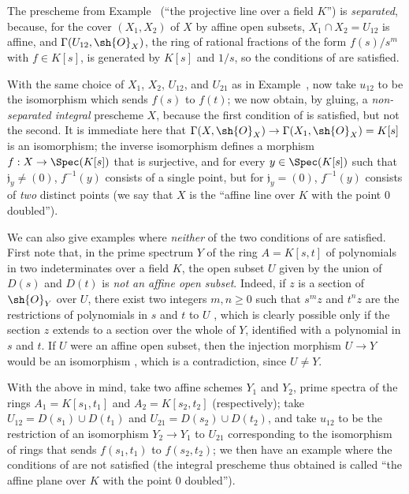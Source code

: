\begin{examples}[5.5.11]
\label{I.5.5.11}
The prescheme from Example~ (``the projective line over a field $K$'') is \emph{separated}, because, for the cover $(X_1,X_2)$ of $X$ by affine open subsets, $X_1\cap X_2=U_{12}$ is affine, and $\Gamma(U_{12},\sh{O}_X)$, the ring of rational fractions of the form $f(s)/s^m$ with $f\in K[s]$, is generated by $K[s]$ and $1/s$, so the conditions of  are satisfied.

With the same choice of $X_1$, $X_2$, $U_{12}$, and $U_{21}$ as in Example~, now take $u_{12}$ to be the isomorphism which sends $f(s)$ to $f(t)$;
we now obtain, by gluing, a \emph{non-separated integral} prescheme $X$, because the first condition of  is satisfied, but not the second.
It is immediate here that $\Gamma(X,\sh{O}_X)\to\Gamma(X_1,\sh{O}_X)=K[s]$ is an isomorphism;
the inverse isomorphism defines a morphism $f:X\to\Spec(K[s])$ that is surjective, and for every $y\in\Spec(K[s])$ such that $\mathfrak{j}_y\neq(0)$, $f^{-1}(y)$ consists of a single point, but for $\mathfrak{j}_y=(0)$, $f^{-1}(y)$ consists of \emph{two} distinct points (we say that $X$ is the ``affine line over $K$ with the point $0$ doubled'').

We can also give examples where \emph{neither} of the two conditions of  are satisfied.
First note that, in the prime spectrum $Y$ of the ring $A=K[s,t]$ of polynomials in two indeterminates over a field $K$, the open subset $U$ given by the union of $D(s)$ and $D(t)$ is \emph{not an affine open subset}.
Indeed, if $z$ is a section of $\sh{O}_Y$ over $U$, there exist two integers $m,n\geq0$ such that $s^mz$ and $t^nz$ are the restrictions of polynomials in $s$ and $t$ to $U$ , which is clearly possible only if the section $z$ extends to a section over the whole of $Y$, identified with a polynomial in $s$ and $t$.
If $U$ were an affine open subset, then the injection morphism $U\to Y$ would be an isomorphism , which is a contradiction, since $U\neq Y$.

With the above in mind, take two affine schemes $Y_1$ and $Y_2$, prime spectra of the rings $A_1=K[s_1,t_1]$ and $A_2=K[s_2,t_2]$ (respectively);
take $U_{12}=D(s_1)\cup D(t_1)$ and $U_{21}=D(s_2)\cup D(t_2)$, and take $u_{12}$ to be the restriction of an isomorphism $Y_2\to Y_1$ to $U_{21}$ corresponding to the isomorphism of rings that sends $f(s_1,t_1)$ to $f(s_2,t_2)$;
we then have an example where the conditions of  are not satisfied (the integral prescheme thus obtained is called ``the affine plane over $K$ with the point $0$ doubled'').
\end{examples}

